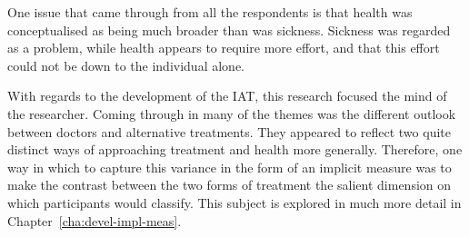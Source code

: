 One issue that came through from all the respondents is that health was conceptualised as being much broader than was sickness. Sickness was regarded as a problem, while health appears to require more effort, and that this effort could not be down to the individual alone. 

With regards to the development of the IAT, this research focused the mind of the researcher. Coming through in many of the themes was the different outlook between doctors and alternative treatments. They appeared to reflect two quite distinct ways of approaching treatment and health more generally. Therefore, one way in which to capture this variance in the form of an implicit measure was to make the contrast between the two forms of treatment the salient dimension on which participants would classify. This subject is explored in much more detail in Chapter~\ref{cha:devel-impl-meas}.
